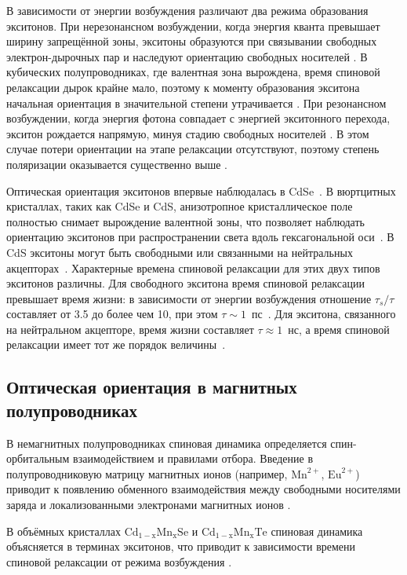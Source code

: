 \documentclass[14pt]{extarticle}
\numberwithin{equation}{section}
\begin{document}
В зависимости от энергии возбуждения различают два режима образования экситонов. 
При нерезонансном возбуждении, когда энергия кванта превышает ширину запрещённой 
зоны, экситоны образуются при связывании свободных электрон-дырочных пар и 
наследуют ориентацию свободных носителей \cite{zakharchenya_opt_or}. В кубических полупроводниках, где 
валентная зона вырождена, время спиновой релаксации дырок крайне мало, поэтому к моменту образования экситона начальная 
ориентация в значительной степени утрачивается \cite{zakharchenya_opt_or}. 
При резонансном возбуждении, когда энергия фотона 
совпадает с энергией экситонного перехода, экситон рождается напрямую, минуя 
стадию свободных носителей \cite{zakharchenya_opt_or}. В этом случае потери ориентации на этапе релаксации 
отсутствуют, поэтому степень поляризации оказывается существенно выше 
\cite{zakharchenya_opt_or, Bonnot}.

Оптическая ориентация экситонов впервые наблюдалась в CdSe~\cite{Gross1971}. 
В вюртцитных кристаллах, таких как CdSe и CdS, анизотропное кристаллическое поле 
полностью снимает вырождение валентной зоны, что позволяет наблюдать ориентацию 
экситонов при распространении света вдоль гексагональной оси~\cite{Gross1971}. 
В CdS экситоны могут быть свободными или связанными на нейтральных акцепторах~\cite{Bonnot}. 
Характерные времена спиновой релаксации для этих двух типов экситонов различны. 
Для свободного экситона время спиновой релаксации превышает время жизни: в зависимости 
от энергии возбуждения отношение \( \tau_s / \tau \) составляет от 3.5 до более чем 10, 
при этом \( \tau \sim 1  \)~пс~\cite{Bonnot}. 
Для экситона, связанного на нейтральном акцепторе, время жизни составляет 
\( \tau \approx 1 \)~нс, а время спиновой релаксации имеет тот же порядок величины~\cite{Bonnot}.



\subsection{Оптическая ориентация в магнитных полупроводниках}

В немагнитных полупроводниках спиновая динамика определяется
спин-орбитальным взаимодействием и правилами отбора.
Введение в полупроводниковую матрицу магнитных ионов (например,
$\mathrm{Mn}^{2+}$, $\mathrm{Eu}^{2+}$) приводит к появлению обменного
взаимодействия между свободными носителями заряда и локализованными
электронами магнитных ионов \cite{Furdyna1988,Usachev}.

В объёмных кристаллах $\mathrm{Cd_{1-x}Mn_xSe}$ и $\mathrm{Cd_{1-x}Mn_xTe}$
спиновая динамика объясняется в терминах экситонов, что приводит к
зависимости времени спиновой релаксации от режима
возбуждения \cite{WARNOCK1985}.
\end{document}
